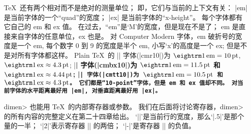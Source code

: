 \danger \TeX\ 还有两个相对而不是绝对的测量单位；
即，它们与当前的上下文有关：
\begindisplay
|em| 是当前字体的一个``{quad}''的宽度；\cr
|ex| 是当前字体的``{x-height}''。\cr
\enddisplay
每个字体都有它自己的 em 和 ex 值。%
在过去，``em''是`M'的宽度，但是现在不是了；
em 是直接来自字体的任意单位，ex 也是。%
对 Computer Modern 字体，em 破折号的宽度是一个 em,
每个数字 0 到 9 的宽度是半个 em, 小写`x'的高度是一个 ex;
但是不是对所有字体都这样。%
Plain \TeX\ 的 |\rm| 字体(|cmr10|)为 $\rm1\,em=10\,pt$, $\rm1\,ex\approx4.3\,pt$;
|\bf| 字体(|cmbx10|)为 $\rm1\,em=11.5\,pt$ 和 $\rm1\,ex\approx4.44\,pt$;
|\tt| 字体(|cmtt10|)为 $\rm1\,em=10.5\,pt$ 和 $\rm1\,ex\approx4.3\,pt$。%
它们都是``10-point''字体，但是 em 和 ex 值却不同。%
对当前字体的水平距离最好用 |em|, 对垂直距离最好用 |ex|。

\danger \1\<dimen> 也能用 \TeX\ 的内部寄存器或参数。%
我们在后面将讨论寄存器，\<dimen> 的所有内容的完整定义在第二十四章给出。%
`|\hsize|'是当前行的宽度，那么`|.5\hsize|'是那个量的一半；
`|2|'表示寄存器 || 的两倍；
`|-|'是寄存器 || 的负值。

